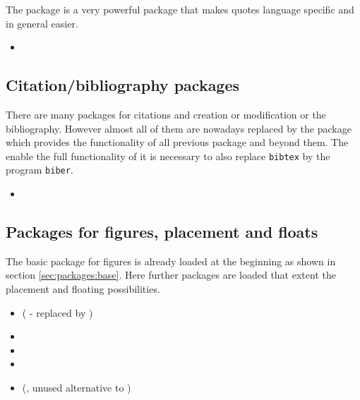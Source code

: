 The package  is a very powerful package that makes quotes language specific and in general easier.

\begin{itemize}[noitemsep]
\item {}
\end{itemize}


\subsection{Citation/bibliography packages}
\label{sec:packages:bibliography}
There are many packages for citations and creation or modification or the bibliography. However almost all of them are nowadays replaced by the package 
 which provides the functionality of all previous package and beyond them. The enable the full functionality of  it is necessary to also replace \texttt{bibtex} by the program \texttt{biber}.

\begin{itemize}[noitemsep]
\item {}
\end{itemize}


\subsection{Packages for figures, placement and floats}
\label{sec:packages:figures}

The basic package  for figures is already loaded at the beginning as shown in section \ref{sec:packages:base}. Here further packages are loaded that extent the placement and floating possibilities.

\begin{itemize}[noitemsep]
\item (  - replaced by )
\item {}
\item {}
\item {}
\item (, unused alternative to )
\end{itemize}

